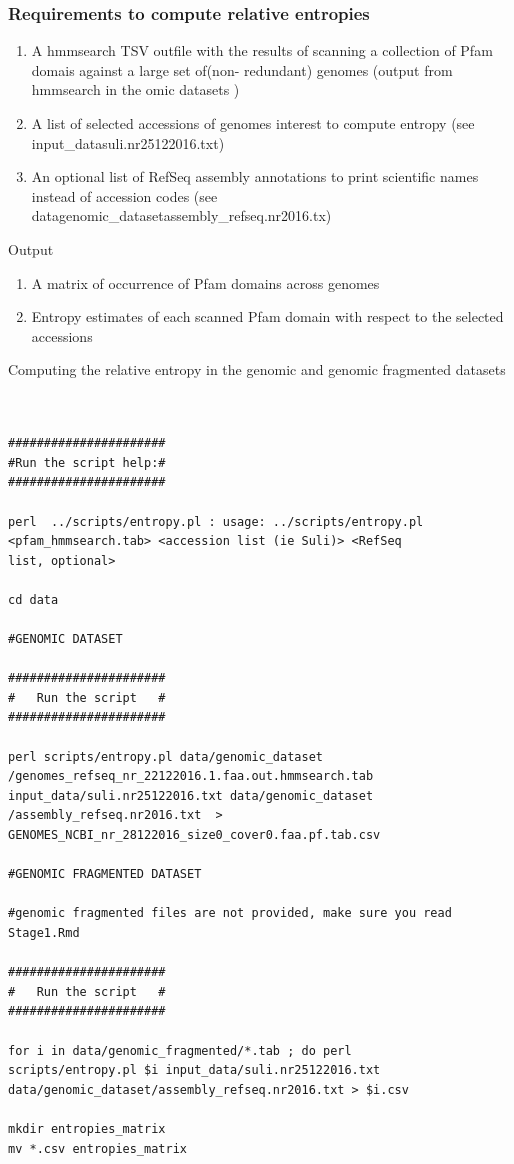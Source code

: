 \documentclass[a4paper,11pt]{report}
\begin{document}
\subsubsection{Requirements to compute relative entropies}
\label{entropies_requirements}
\begin{enumerate}
\item  A hmmsearch TSV outfile with the results of scanning 
a collection of Pfam domais against  a large set of(non-
redundant) genomes (output from hmmsearch in the omic 
datasets )
\item A list of selected accessions of genomes interest to compute entropy (see input\_data\/suli.nr25122016.txt)
\item An optional list of RefSeq assembly annotations to print scientific names instead of accession codes (see \/data\/genomic\_dataset\/assembly\_refseq.nr2016.tx)
\end{enumerate}

Output
 \begin{enumerate}
\item A matrix of occurrence of Pfam domains across genomes
\item Entropy estimates of each scanned Pfam domain with respect to the selected accessions
\end{enumerate}

Computing the relative entropy in the genomic and genomic fragmented datasets 

\begin{verbatim}


######################
#Run the script help:#
######################

perl  ../scripts/entropy.pl : usage: ../scripts/entropy.pl 
<pfam_hmmsearch.tab> <accession list (ie Suli)> <RefSeq 
list, optional>

cd data

#GENOMIC DATASET

######################
#   Run the script   #
######################

perl scripts/entropy.pl data/genomic_dataset
/genomes_refseq_nr_22122016.1.faa.out.hmmsearch.tab 
input_data/suli.nr25122016.txt data/genomic_dataset
/assembly_refseq.nr2016.txt  > 
GENOMES_NCBI_nr_28122016_size0_cover0.faa.pf.tab.csv

#GENOMIC FRAGMENTED DATASET  

#genomic fragmented files are not provided, make sure you read 
Stage1.Rmd 

######################
#   Run the script   #
######################

for i in data/genomic_fragmented/*.tab ; do perl 
scripts/entropy.pl $i input_data/suli.nr25122016.txt 
data/genomic_dataset/assembly_refseq.nr2016.txt > $i.csv 

mkdir entropies_matrix
mv *.csv entropies_matrix

\end{verbatim}
\end{document}
